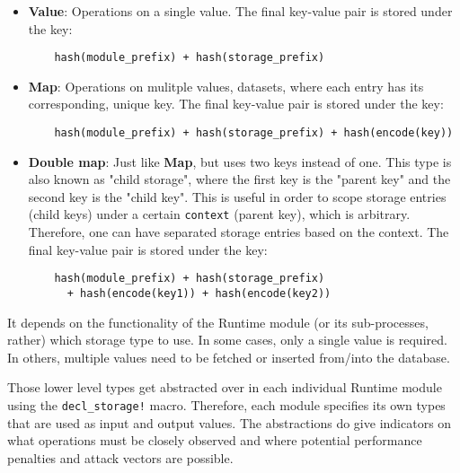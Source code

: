 \documentclass[11pt,a4paper]{article}
\begin{document}
\begin{itemize}
  \item \textbf{Value}: Operations on a single value. \newline\newline
  The final key-value pair is stored under the key:\newline
  \begin{verbatim}
    hash(module_prefix) + hash(storage_prefix)
  \end{verbatim}
  \item \textbf{Map}: Operations on mulitple values, datasets, where each entry
  has its corresponding, unique key. \newline\newline
  The final key-value pair is stored under the key:\newline
  \begin{verbatim}
    hash(module_prefix) + hash(storage_prefix) + hash(encode(key))
  \end{verbatim}
  \item \textbf{Double map}: Just like \textbf{Map}, but uses two keys instead
  of one. This type is also known as "child storage", where the first key is the
  "parent key" and the second key is the "child key". This is useful in order to
  scope storage entries (child keys) under a certain \verb|context| (parent
  key), which is arbitrary. Therefore, one can have separated storage entries
  based on the context.
  \newline\newline
  The final key-value pair is stored under the key:\newline
  \begin{verbatim}
    hash(module_prefix) + hash(storage_prefix)
      + hash(encode(key1)) + hash(encode(key2))
  \end{verbatim}
\end{itemize}

It depends on the functionality of the Runtime module (or its sub-processes,
rather) which storage type to use. In some cases, only a single value is
required. In others, multiple values need to be fetched or inserted from/into
the database.
\newline

Those lower level types get abstracted over in each individual Runtime module
using the \verb|decl_storage!| macro. Therefore, each module specifies its own
types that are used as input and output values. The abstractions do give
indicators on what operations must be closely observed and where potential
performance penalties and attack vectors are possible.
\end{document}
